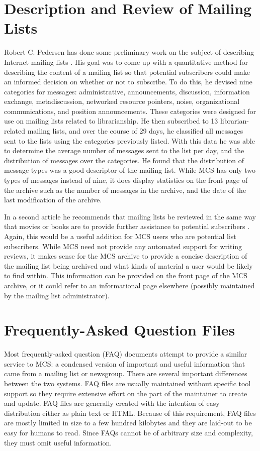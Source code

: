\section{Description and Review of Mailing Lists}
Robert C. Pedersen has done some preliminary work on the subject of describing
Internet mailing lists \cite{pedersen1-96}. His goal was to come up with a
quantitative method for describing the content of a mailing list so that
potential subscribers could make an informed decision on whether or not to
subscribe. To do this, he devised nine categories for messages: administrative,
announcements, discussion, information exchange, metadiscussion, networked
resource pointers, noise, organizational communications, and position
announcements. These categories were designed for use on mailing lists related
to librarianship. He then subscribed to 13 librarian-related mailing lists, and
over the course of 29 days, he classified all messages sent to the lists using
the categories previously listed. With this data he was able to determine the
average number of messages sent to the list per day, and the distribution of
messages over the categories. He found that the distribution of message types
was a good descriptor of the mailing list. While MCS has only two types of
messages instead of nine, it does display statistics on the front page of the
archive such as the number of messages in the archive, and the date of the last
modification of the archive.

In a second article he recommends that mailing lists be reviewed in the same
way that movies or books are to provide further assistance to potential
subscribers \cite{pedersen2-96}. Again, this would be a useful addition for MCS
users who are potential list subscribers. While MCS need not provide any
automated support for writing reviews, it makes sense for the MCS archive to
provide a concise description of the mailing list being archived and what kinds
of material a user would be likely to find within. This information can be
provided on the front page of the MCS archive, or it could refer to an
informational page elsewhere (possibly maintained by the mailing list
administrator).

\section{Frequently-Asked Question Files}
Most frequently-asked question (FAQ) documents attempt to provide a similar
service to MCS: a condensed version of important and useful information that
came from a mailing list or newsgroup. There are several important differences
between the two systems. FAQ files are usually maintained without specific tool
support so they require extensive effort on the part of the maintainer to
create and update. FAQ files are generally created with the intention of easy
distribution either as plain text or HTML. Because of this requirement, FAQ
files are mostly limited in size to a few hundred kilobytes and they are
laid-out to be easy for humans to read. Since FAQs cannot be of arbitrary size
and complexity, they must omit useful information.

